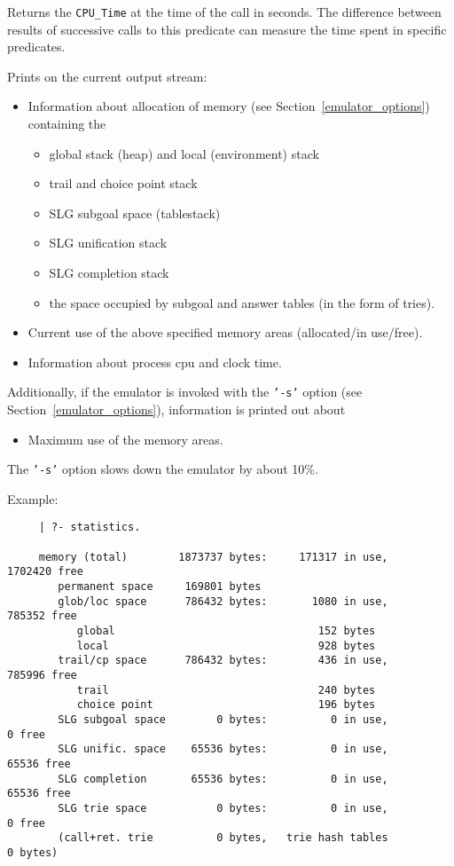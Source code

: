 \begin{description}
    Returns the {\tt CPU\_Time} at the time of the call in seconds.
    The difference between results of successive calls to this
    predicate can measure the time spent in specific predicates.

    Prints on the current output stream:
    \begin{itemize}
    \item Information about allocation of memory 
	  (see Section~\ref{emulator_options}) containing the 
          \begin{itemize}
          \item global stack (heap) and local (environment) stack
          \item trail and choice point stack
	  \item SLG subgoal space (tablestack)
          \item SLG unification stack
          \item SLG completion stack
	  \item the space occupied by subgoal and answer tables
		(in the form of tries).
          \end{itemize}
    \item Current use of the above specified memory areas
		(allocated/in use/free).
    \item Information about process cpu and clock time.
    \end{itemize}

    Additionally, if the emulator is invoked with the {\tt '-s'} option
    (see Section~\ref{emulator_options}), information is printed out about
    \begin{itemize}
    \item Maximum use of the memory areas.
    \end{itemize}
    The {\tt '-s'} option slows down the emulator by about 10\%.

    Example:
    {\footnotesize
     \begin{verbatim}
     | ?- statistics.

     memory (total)        1873737 bytes:     171317 in use,    1702420 free
        permanent space     169801 bytes
        glob/loc space      786432 bytes:       1080 in use,     785352 free
           global                                152 bytes
           local                                 928 bytes
        trail/cp space      786432 bytes:        436 in use,     785996 free
           trail                                 240 bytes
           choice point                          196 bytes
        SLG subgoal space        0 bytes:          0 in use,          0 free
        SLG unific. space    65536 bytes:          0 in use,      65536 free
        SLG completion       65536 bytes:          0 in use,      65536 free
        SLG trie space           0 bytes:          0 in use,          0 free
        (call+ret. trie          0 bytes,   trie hash tables          0 bytes)


\end{verbatim}}
\end{description}
